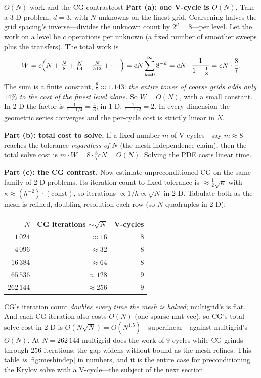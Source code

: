 \begin{workedexample}{$O(N)$ work and the CG contrast}{cost}
\textbf{Part (a): one V-cycle is $O(N)$.} Take a 3-D problem, $d=3$, with $N$ unknowns on the
finest grid. Coarsening halves the grid spacing's inverse---divides the unknown count by
$2^d = 8$---per level. Let the work on a level be $c$ operations per unknown (a fixed number
of smoother sweeps plus the transfers). The total work is
\[
  W = c\Bigl(N + \tfrac{N}{8} + \tfrac{N}{64} + \tfrac{N}{512} + \cdots\Bigr)
    = cN\sum_{k=0}^{\infty} 8^{-k} = cN\cdot\frac{1}{1-\tfrac18} = cN\cdot\frac{8}{7}.
\]
The sum is a finite constant, $\tfrac87 \approx 1.143$: \emph{the entire tower of coarse
grids adds only $14\%$ to the cost of the finest level alone.} So $W = O(N)$, with a small
constant. In 2-D the factor is $\tfrac{1}{1-1/4} = \tfrac43$; in 1-D, $\tfrac{1}{1-1/2}=2$.
In every dimension the geometric series converges and the per-cycle cost is strictly linear
in $N$.

\textbf{Part (b): total cost to solve.} If a fixed number $m$ of V-cycles---say $m\approx
8$---reaches the tolerance \emph{regardless of $N$} (the mesh-independence claim), then the
total solve cost is $m\cdot W = 8\cdot\tfrac87 cN = O(N)$. Solving the PDE costs linear time.

\textbf{Part (c): the CG contrast.} Now estimate unpreconditioned CG on the same family of
2-D problems. Its iteration count to fixed tolerance is $\approx \tfrac12\sqrt{\kappa}$ with
$\kappa \approx (h^{-2})\cdot(\text{const})$, so iterations $\propto 1/h \propto
\sqrt{N}$ in 2-D. Tabulate both as the mesh is refined, doubling resolution each row (so $N$
quadruples in 2-D):
\begin{center}\small
\begin{tabular}{@{}rrr@{}}
\toprule
$N$ & CG iterations $\sim\!\sqrt{N}$ & V-cycles \\
\midrule
$1\,024$      & $\approx 16$  & $8$ \\
$4\,096$      & $\approx 32$  & $8$ \\
$16\,384$     & $\approx 64$  & $8$ \\
$65\,536$     & $\approx 128$ & $9$ \\
$262\,144$    & $\approx 256$ & $9$ \\
\bottomrule
\end{tabular}
\end{center}
CG's iteration count \emph{doubles every time the mesh is halved}; multigrid's is flat. And
each CG iteration also costs $O(N)$ (one sparse mat-vec), so CG's total solve cost in 2-D is
$O(N\sqrt{N}) = O(N^{1.5})$---superlinear---against multigrid's $O(N)$. At $N=262\,144$
multigrid does the work of $9$ cycles while CG grinds through $256$ iterations; the gap
widens without bound as the mesh refines. This table \emph{is} \cref{fig:meshindep} in
numbers, and it is the entire case for preconditioning the Krylov solve with a V-cycle---the
subject of the next section.
\end{workedexample}

